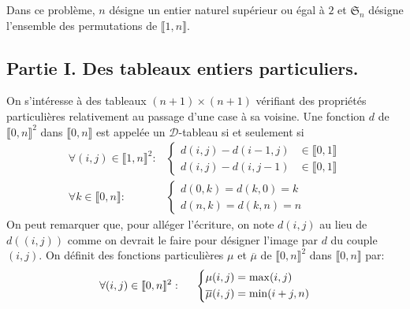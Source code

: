 Dans ce problème, $n$ désigne un entier naturel supérieur ou égal à $2$ et $\mathfrak{S}_n$ désigne l'ensemble des permutations de $\llbracket 1,n \rrbracket$. 
\subsection*{Partie I. Des tableaux entiers particuliers.}
On s'intéresse à des tableaux $(n+1)\times (n+1)$ vérifiant des propriétés particulières relativement au passage d'une case à sa voisine.\newline
Une fonction $d$ de $\llbracket 0,n \rrbracket^2$ dans $\llbracket 0,n \rrbracket$ est appelée un $\mathcal{D}$-tableau si et seulement si
\begin{align*}
  \forall (i,j)\in \llbracket 1,n\rrbracket^2:
  &\left\lbrace 
  \begin{aligned}
    d(i,j) -  d(i-1,j) &\in \llbracket 0, 1 \rrbracket \\
    d(i,j) -  d(i,j-1) &\in \llbracket 0, 1 \rrbracket
  \end{aligned}\right. \\
  \forall k\in \llbracket 0,n\rrbracket:
  &\left\lbrace 
  \begin{aligned}
    d(0,k) = d(k,0) = k \\
    d(n,k) = d(k,n) = n
  \end{aligned}\right.   
\end{align*}
On peut remarquer que, pour alléger l'écriture, on note $d(i,j)$ au lieu de $d((i,j))$ comme on devrait le faire pour désigner l'image par $d$ du couple $(i,j)$.\newline
On définit des fonctions particulières $\mu$ et $\overline{\mu}$ de $\llbracket 0,n \rrbracket^2$ dans  $\llbracket 0,n \rrbracket$ par:
\begin{displaymath}
  \forall (i,j)\in  \llbracket 0,n \rrbracket^2:\hspace{0.5cm}
\left\lbrace 
  \begin{aligned}
    \mu(i,j) &= \max(i,j) \\ \overline{\mu}(i,j) &= \min(i+j,n)
  \end{aligned}
\right. 
\end{displaymath}
